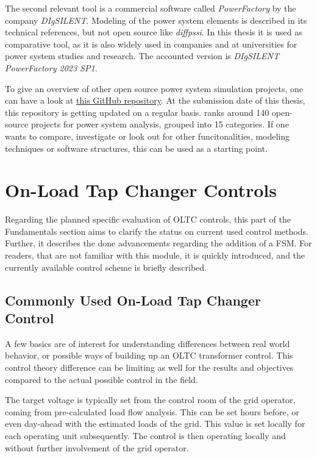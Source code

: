 The second relevant tool is a commercial software called \textit{PowerFactory} by the company \textit{DIgSILENT}.
Modeling of the power system elements is described in its technical references, but not open source like \textit{diffpssi}.
In this thesis it is used as comparative tool, as it is also widely used in companies and at universities for power system studies and research.
The accounted version is \textit{DIgSILENT PowerFactory 2023 SP1}.

To give an overview of other open source power system simulation projects, one can have a look at \href{https://github.com/ps-wiki/best-of-ps}{this GitHub repository}.
At the submission date of this thesis, this repository is getting updated on a regular basis.
\textcite{jinningwang_2025} ranks around 140 open-source projects for power system analysis, grouped into 15 categories.
If one wants to compare, investigate or look out for other funcitonalities, modeling techniques or software structures, this can be used as a starting point.
        
\section{On-Load Tap Changer Controls}

Regarding the planned specific evaluation of \acs{OLTC} controls, this part of the Fundamentals section aims to clarify the status on current used control methods.
Further, it describes the done advancements regarding the addition of a \acf{FSM}.
For readers, that are not familiar with this module, it is quickly introduced, and the currently available control scheme is briefly described.

\subsection{Commonly Used On-Load Tap Changer Control}

A few basics are of interest for understanding differences between real world behavior, or possible ways of building up an \acs{OLTC} transformer control. 
This control theory difference can be limiting as well for the results and objectives compared to the actual possible control in the field.

The target voltage is typically set from the control room of the grid operator, coming from pre-calculated load flow analysis. 
This can be set hours before, or even day-ahead with the estimated loads of the grid. 
This value is set locally for each operating unit subsequently. 
The control is then operating locally and without further involvement of the grid operator. \quelle

